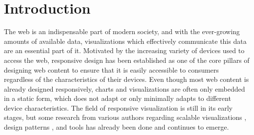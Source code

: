 \chapter{Introduction}
\label{chap:Introduction}

The web is an indispensable part of modern society, and with the
ever-growing amounts of available data, visualizations which
effectively communicate this data are an essential part of it.
Motivated by the increasing variety of devices used to access the web,
responsive design has been established as one of the core pillars of
designing web content to ensure that it is easily accessible to
consumers regardless of the characteristics of their devices. Even
though most web content is already designed responsively, charts and
visualizations are often only embedded in a static form, which does
not adapt or only minimally adapts to different device
characteristics. The field of responsive visualization is still in its
early stages, but some research from various authors regarding
scalable visualizations
\parencite{BuildingRespDataVisForTheWeb,LearningRespDataVis}, design
patterns
\parencite{RespVisTalk,RespVisPage,RespVis,TechniquesForFlexibleRespVisDesign,
  DesignPatternsTradeOffsRespVis}, and tools
\parencite{TechniquesForFlexibleRespVisDesign} has already been done
and continues to emerge.



